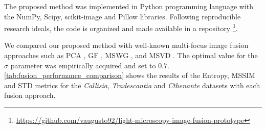 The proposed method was implemented in Python programming language with the NumPy, Scipy, scikit-image and Pillow libraries. Following reproducible research ideals, the code is organized and made available in a repository \footnote{\url{https://github.com/vaugusto92/light-microscopy-image-fusion-prototype}}.

We compared our proposed method with well-known multi-focus image fusion approaches such as PCA \cite{naidu2008pixel}, GF \cite{li2013image}, MSWG \cite{zhou2014multi}, and MSVD \cite{naidu2011image}. The optimal value for the $\sigma$ parameter was empirically acquired and set to $0.7$. \autoref{tab:fusion_performance_comparison} shows the results of the Entropy, MSSIM and STD metrics for the \textit{Callisia}, \textit{Tradescantia} and \textit{Cthenante} datasets with each fusion approach.

